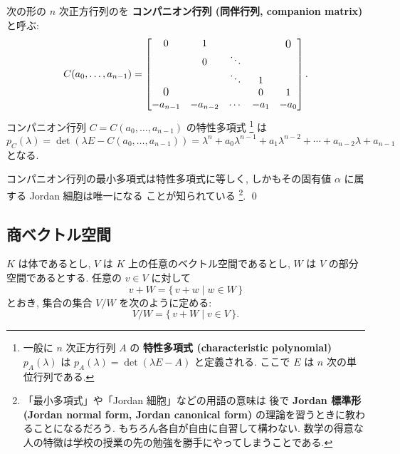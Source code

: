 \documentclass[12pt,twoside]{jarticle}
\begin{document}
\begin{guide}[コンパニオン行列]
  \label{guide:companion-matrix}
  次の形の $n$ 次正方行列のを {\bf コンパニオン行列 (同伴行列, 
  companion matrix)} と呼ぶ:
  \begin{equation*}
    C(a_0,\dots,a_{n-1}) =
    \begin{bmatrix}
      0         &    1     &        &      & \bigzerou \\
                &    0     & \ddots &      & \\
                &          & \ddots &  1   & \\
      \bigzerol &          &        &  0   &  1 \\
      -a_{n-1}  & -a_{n-2} & \cdots & -a_1 & -a_0 \\
    \end{bmatrix}.
  \end{equation*}
  コンパニオン行列 $C = C(a_0,\dots,a_{n-1})$ の特性多項式%
  \footnote{一般に $n$ 次正方行列 $A$ の
    {\bf 特性多項式 (characteristic polynomial)} $p_A(\lambda)$ 
    は $p_A(\lambda)=\det(\lambda E - A)$ と定義される.
    ここで $E$ は $n$ 次の単位行列である.}%
  は
  \begin{equation*}
    p_C(\lambda)
    = \det(\lambda E - C(a_0,\ldots,a_{n-1}))
    = \lambda^n + a_0\lambda^{n-1} + a_1\lambda^{n-2}
    + \cdots + a_{n-2}\lambda + a_{n-1}
  \end{equation*}
  となる. %
  
  コンパニオン行列の最小多項式は特性多項式に等しく,
  しかもその固有値 $\alpha$ に属する Jordan 細胞は唯一になる
  ことが知られている%
  \footnote{「最小多項式」や「Jordan 細胞」などの用語の意味は
    後で {\bf Jordan 標準形 (Jordan normal form, Jordan canonical form)} 
    の理論を習うときに教わることになるだろう.
    もちろん各自が自由に自習して構わない.
    数学の得意な人の特徴は学校の授業の先の勉強を勝手にやってしまうことである.}.
  \qed
\end{guide}


\subsection{商ベクトル空間}
\label{sec:quotient-vector-space}

$K$ は体であるとし, $V$ は $K$ 上の任意のベクトル空間であるとし, 
$W$ は $V$ の部分空間であるとする.  任意の $v\in V$ に対して
\begin{equation*}
  v + W = \{\, v+w \mid w\in W \,\}
\end{equation*}
とおき, 集合の集合 $V/W$ を次のように定める:
\begin{equation*}
  V/W = \{\, v+W \mid v \in V \,\}.
\end{equation*}
\end{document}
